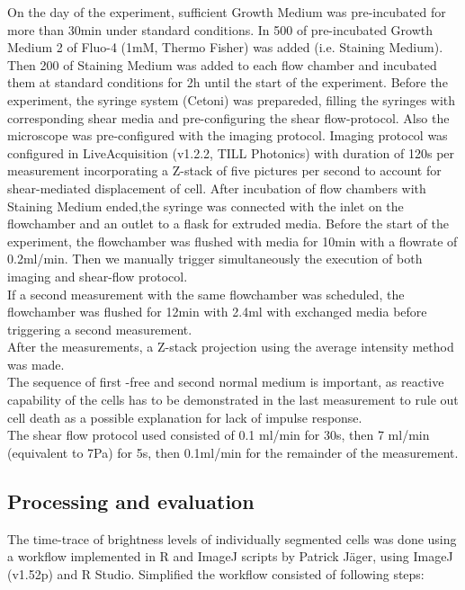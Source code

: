 On the day of the experiment, sufficient Growth Medium was pre-incubated for more than 30min under standard conditions. In 500\mul{} of pre-incubated Growth Medium 2\mul{} of Fluo-4 (1mM, Thermo Fisher) was added (i.e. Staining Medium). Then 200\mul{} of Staining Medium was added to each flow chamber and incubated them at standard conditions for 2h until the start of the experiment. Before the experiment, the syringe system (Cetoni) was prepareded, filling the syringes with corresponding shear media and pre-configuring the shear flow-protocol. Also the microscope was pre-configured with the imaging protocol. Imaging protocol was configured in LiveAcquisition (v1.2.2, TILL Photonics) with duration of 120s per measurement incorporating a Z-stack of five pictures per second to account for shear-mediated displacement of cell.
After incubation of flow chambers with Staining Medium ended,the syringe was connected with the inlet on the flowchamber and an outlet to a flask for extruded media. Before the start of the experiment, the flowchamber was flushed with media for 10min with a flowrate of 0.2ml/min. Then we manually trigger simultaneously the execution of both imaging and shear-flow protocol.\\
If a second measurement with the same flowchamber was scheduled, the flowchamber was flushed for 12min with 2.4ml with exchanged media before triggering a second measurement.\\
After the measurements, a Z-stack projection using the average intensity method was made.\\
The sequence of first \calcium{}-free and second normal medium is important, as reactive capability of the cells has to be demonstrated in the last measurement to rule out cell death as a possible explanation for lack of impulse response.\\
The shear flow protocol used consisted of 0.1 ml/min for 30s, then 7 ml/min (equivalent to 7Pa) for 5s, then 0.1ml/min for the remainder of the measurement. 

\subsection{Processing and evaluation}
\label{sub:Processing}

The time-trace of brightness levels of individually segmented cells was done using a workflow implemented in R and ImageJ scripts by Patrick Jäger, using ImageJ (v1.52p) and R Studio. Simplified the workflow consisted of following steps:

